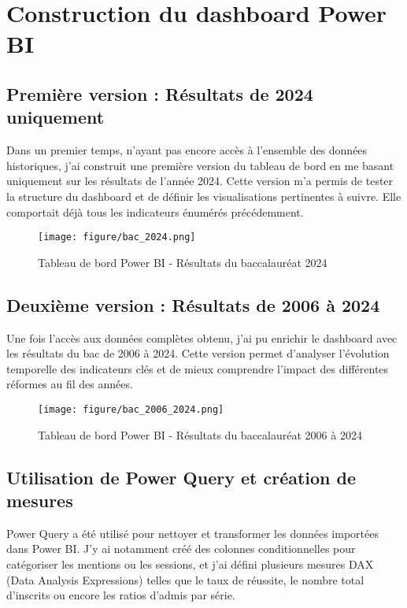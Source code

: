 \newpage
\section{Construction du dashboard Power BI}

\subsection{Première version : Résultats de 2024 uniquement}

Dans un premier temps, n’ayant pas encore accès à l’ensemble des données historiques, 
j’ai construit une première version du tableau de bord en me basant uniquement sur les résultats de l’année 2024. 
Cette version m’a permis de tester la structure du dashboard et de définir les visualisations pertinentes à suivre. 
Elle comportait déjà tous les indicateurs énumérés précédemment.
\vspace{1cm}
\begin{figure}[htbp]
    \centering
    \caption{Tableau de bord Power BI - Résultats du baccalauréat 2024}
    \texttt{[image: figure/bac\_2024.png]}
\end{figure}

\newpage
\subsection{ Deuxième version : Résultats de 2006 à 2024}

Une fois l’accès aux données complètes obtenu, j’ai pu enrichir le dashboard avec les résultats du bac de 2006 à 2024. 
Cette version permet d’analyser l’évolution temporelle des indicateurs clés et de mieux comprendre l’impact des différentes réformes au fil des années.
\vspace{1cm}
\begin{figure}[htbp]
    \centering
    \caption{Tableau de bord Power BI - Résultats du baccalauréat 2006 à 2024}
    \texttt{[image: figure/bac\_2006\_2024.png]}
\end{figure}

\newpage
\subsection{Utilisation de Power Query et création de mesures}

Power Query a été utilisé pour nettoyer et transformer les données importées dans Power BI. 
J’y ai notamment créé des colonnes conditionnelles pour catégoriser les mentions ou les sessions, 
et j’ai défini plusieurs mesures DAX (Data Analysis Expressions) telles que le taux de réussite, 
le nombre total d’inscrits ou encore les ratios d’admis par série.

